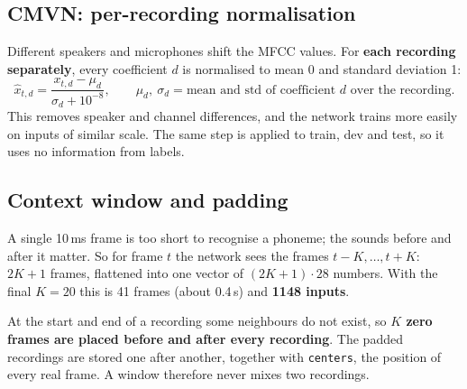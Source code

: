 \documentclass[11pt,a4paper]{article}
\begin{document}
\subsection{CMVN: per-recording normalisation}\label{sec:cmvn}
Different speakers and microphones shift the MFCC values. For \textbf{each recording separately}, every
coefficient $d$ is normalised to mean 0 and standard deviation 1:
\[
  \hat{x}_{t,d} = \frac{x_{t,d} - \mu_d}{\sigma_d + 10^{-8}},
  \qquad \mu_d,\ \sigma_d = \text{mean and std of coefficient } d \text{ over the recording.}
\]
This removes speaker and channel differences, and the network trains more easily on inputs of similar
scale. The same step is applied to train, dev and test, so it uses no information from labels.

\subsection{Context window and padding}\label{sec:context}
A single 10\,ms frame is too short to recognise a phoneme; the sounds before and after it matter. So
for frame $t$ the network sees the frames $t-K,\dots,t+K$: $2K+1$ frames, flattened into one vector of
$(2K+1)\cdot 28$ numbers. With the final $K=20$ this is 41 frames (about 0.4\,s) and \textbf{1148 inputs}.

At the start and end of a recording some neighbours do not exist, so \textbf{$K$ zero frames are placed
before and after every recording}. The padded recordings are stored one after another, together with
\texttt{centers}, the position of every real frame. A window therefore never mixes two recordings.
\end{document}
